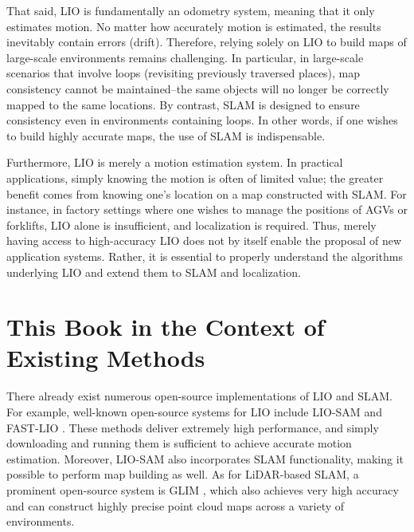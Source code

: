 That said, LIO is fundamentally an odometry system, meaning that it only estimates motion.
No matter how accurately motion is estimated, the results inevitably contain errors (drift).
Therefore, relying solely on LIO to build maps of large-scale environments remains challenging.
In particular, in large-scale scenarios that involve loops (revisiting previously traversed places), map consistency cannot be maintained--the same objects will no longer be correctly mapped to the same locations.
By contrast, SLAM is designed to ensure consistency even in environments containing loops.
In other words, if one wishes to build highly accurate maps, the use of SLAM is indispensable.

Furthermore, LIO is merely a motion estimation system.
In practical applications, simply knowing the motion is often of limited value; the greater benefit comes from knowing one's location on a map constructed with SLAM.
For instance, in factory settings where one wishes to manage the positions of AGVs or forklifts, LIO alone is insufficient, and localization is required.
Thus, merely having access to high-accuracy LIO does not by itself enable the proposal of new application systems.
Rather, it is essential to properly understand the algorithms underlying LIO and extend them to SLAM and localization.





\section{This Book in the Context of Existing Methods}

There already exist numerous open-source implementations of LIO and SLAM.
For example, well-known open-source systems for LIO include LIO-SAM \cite{liosam2020shan} and FAST-LIO \cite{FAST-LIO2}.
These methods deliver extremely high performance, and simply downloading and running them is sufficient to achieve accurate motion estimation.
Moreover, LIO-SAM also incorporates SLAM functionality, making it possible to perform map building as well.
As for LiDAR-based SLAM, a prominent open-source system is GLIM \cite{KoideRAS2024}, which also achieves very high accuracy and can construct highly precise point cloud maps across a variety of environments.


